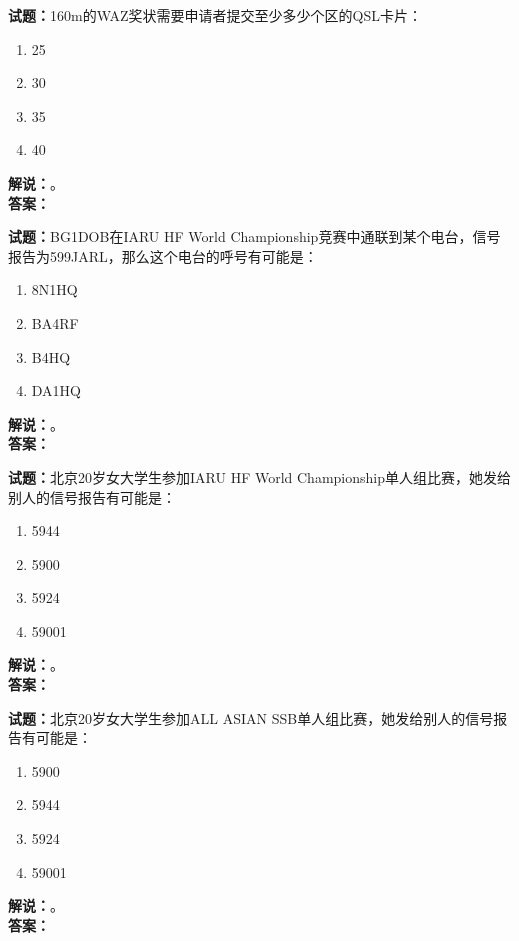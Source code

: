 \documentclass{ctexbook}
\begin{document}
\vspace{\baselineskip}

\noindent\textbf{试题：}160m的WAZ奖状需要申请者提交至少多少个区的QSL卡片：
\begin{enumerate}[leftmargin=3em]
  \item 25
  \item 30
  \item 35
  \item 40
\end{enumerate}
\noindent\textbf{解说：}\textbf{}。\\\noindent\textbf{答案：}

\vspace{\baselineskip}

\noindent\textbf{试题：}BG1DOB在IARU HF World Championship竞赛中通联到某个电台，信号报告为599JARL，那么这个电台的呼号有可能是：
\begin{enumerate}[leftmargin=3em]
  \item 8N1HQ
  \item BA4RF
  \item B4HQ
  \item DA1HQ
\end{enumerate}
\noindent\textbf{解说：}\textbf{}。\\\noindent\textbf{答案：}

\vspace{\baselineskip}

\noindent\textbf{试题：}北京20岁女大学生参加IARU HF World Championship单人组比赛，她发给别人的信号报告有可能是：
\begin{enumerate}[leftmargin=3em]
  \item 5944
  \item 5900
  \item 5924
  \item 59001
\end{enumerate}
\noindent\textbf{解说：}\textbf{}。\\\noindent\textbf{答案：}

\vspace{\baselineskip}

\noindent\textbf{试题：}北京20岁女大学生参加ALL ASIAN SSB单人组比赛，她发给别人的信号报告有可能是：
\begin{enumerate}[leftmargin=3em]
  \item 5900
  \item 5944
  \item 5924
  \item 59001
\end{enumerate}
\noindent\textbf{解说：}\textbf{}。\\\noindent\textbf{答案：}
\end{document}
